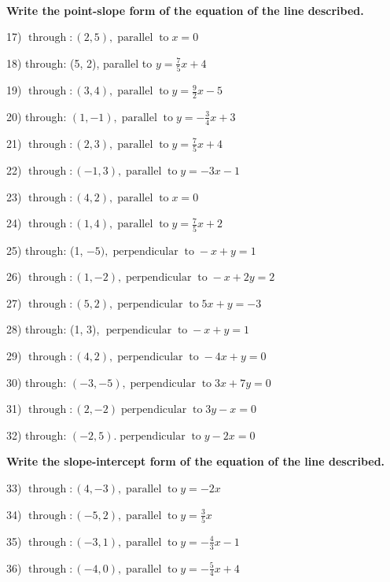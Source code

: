 \documentclass[11pt]{book}
\newcommand{\tmop}[1]{\ensuremath{\operatorname{#1}}}
\newcommand{\tmstrong}[1]{\textbf{#1}}
\theoremstyle{definition}  %
\begin{document}
\

{\tmstrong{Write the point-slope form of the equation of the line
described.}}

17) $\tmop{through} : (2, 5), \tmop{parallel} \tmop{to} x = 0$

18) through: (5, 2), parallel to $y = \frac{7}{5} x + 4$

19) $\tmop{through} : (3, 4), \tmop{parallel} \tmop{to} y = \frac{9}{2} x - 5$

20) through: $(1, - 1), \tmop{parallel} \tmop{to} y = - \frac{3}{4} x + 3$

21) $\tmop{through} : (2, 3), \tmop{parallel} \tmop{to} y = \frac{7}{5} x + 4$

22) $\tmop{through} : (- 1, 3), \tmop{parallel} \tmop{to} y = - 3 x - 1$

23) $\tmop{through} : (4, 2), \tmop{parallel} \tmop{to} x = 0$

24) $\tmop{through} : (1, 4), \tmop{parallel} \tmop{to} y = \frac{7}{5} x + 2$

25) through: (1, $- 5), \tmop{perpendicular} \tmop{to} - x + y = 1$

26) $\tmop{through} : (1, - 2), \tmop{perpendicular} \tmop{to} - x + 2 y = 2$

27) $\tmop{through} : (5, 2), \tmop{perpendicular} \tmop{to} 5 x + y = - 3$

28) through: (1, 3), $\tmop{perpendicular} \tmop{to} - x + y = 1$

29) $\tmop{through} : (4, 2), \tmop{perpendicular} \tmop{to} - 4 x + y = 0$

30) through: $(- 3, - 5), \tmop{perpendicular} \tmop{to} 3 x + 7 y = 0$

31) $\tmop{through} : (2, - 2) \tmop{perpendicular} \tmop{to} 3 y - x = 0$

32) through: $(- 2, 5) . \tmop{perpendicular} \tmop{to} y - 2 x = 0$

\pagebreak

{\tmstrong{Write the slope-intercept form of the equation of the line
described.}}

33) $\tmop{through} : (4, - 3), \tmop{parallel} \tmop{to} y = - 2 x$

34) $\tmop{through} : (- 5, 2), \tmop{parallel} \tmop{to} y = \frac{3}{5} x$

35) $\tmop{through} : (- 3, 1), \tmop{parallel} \tmop{to} y = - \frac{4}{3} x
- 1$

36) $\tmop{through} : (- 4, 0), \tmop{parallel} \tmop{to} y = - \frac{5}{4} x
+ 4$
\end{document}
